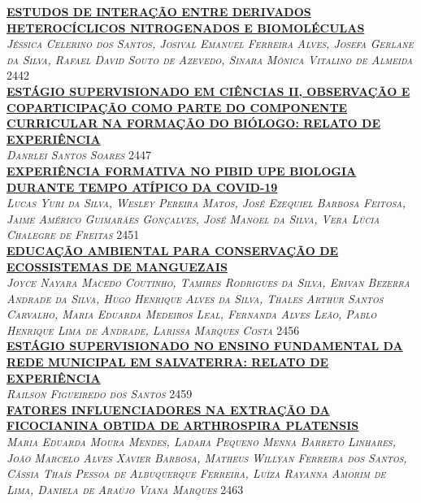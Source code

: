 \noindent \textsc{\hyperlink{trabalhos/248574.pdf.1}{\textbf{ESTUDOS DE INTERAÇÃO ENTRE DERIVADOS HETEROCÍCLICOS NITROGENADOS E BIOMOLÉCULAS}}}\\ 
\noindent \textsc{\textit{Jéssica Celerino dos Santos, Josival Emanuel Ferreira Alves, Josefa Gerlane da Silva, Rafael David Souto de Azevedo, Sinara Mônica Vitalino de Almeida}} \hfill 2442\\ 

\noindent \textsc{\hyperlink{trabalhos/250179.pdf.1}{\textbf{ESTÁGIO SUPERVISIONADO EM CIÊNCIAS II, OBSERVAÇÃO E COPARTICIPAÇÃO COMO PARTE DO COMPONENTE CURRICULAR NA FORMAÇÃO DO BIÓLOGO: RELATO DE EXPERIÊNCIA}}}\\ 
\noindent \textsc{\textit{Danrlei Santos Soares}} \hfill 2447\\ 

\noindent \textsc{\hyperlink{trabalhos/251037.pdf.1}{\textbf{EXPERIÊNCIA FORMATIVA NO PIBID UPE BIOLOGIA DURANTE TEMPO ATÍPICO DA COVID-19}}}\\ 
\noindent \textsc{\textit{Lucas Yuri da Silva, Wesley Pereira Matos, José Ezequiel Barbosa Feitosa, Jaime Américo Guimarães Gonçalves, José Manoel da Silva, Vera Lúcia Chalegre de Freitas}} \hfill 2451\\ 

\noindent \textsc{\hyperlink{trabalhos/250306.pdf.1}{\textbf{EDUCAÇÃO AMBIENTAL PARA CONSERVAÇÃO DE ECOSSISTEMAS DE MANGUEZAIS}}}\\ 
\noindent \textsc{\textit{Joyce Nayara Macedo Coutinho, Tamires Rodrigues da Silva, Erivan Bezerra Andrade da Silva, Hugo Henrique Alves da Silva, Thales Arthur Santos Carvalho, Maria Eduarda Medeiros Leal, Fernanda Alves Leão, Pablo Henrique Lima de Andrade, Larissa Marques Costa}} \hfill 2456\\ 

\noindent \textsc{\hyperlink{trabalhos/247742.pdf.1}{\textbf{ESTÁGIO SUPERVISIONADO NO ENSINO FUNDAMENTAL DA REDE MUNICIPAL EM SALVATERRA: RELATO DE EXPERIÊNCIA }}}\\ 
\noindent \textsc{\textit{Railson Figueiredo dos Santos}} \hfill 2459\\ 

\noindent \textsc{\hyperlink{trabalhos/250086.pdf.1}{\textbf{FATORES INFLUENCIADORES NA EXTRAÇÃO DA FICOCIANINA OBTIDA DE ARTHROSPIRA PLATENSIS}}}\\ 
\noindent \textsc{\textit{Maria Eduarda Moura Mendes, Ladaha Pequeno Menna Barreto Linhares, João Marcelo Alves Xavier Barbosa, Matheus Willyan Ferreira dos Santos, Cássia Thaís Pessoa de Albuquerque Ferreira, Luíza Rayanna Amorim de Lima, Daniela de Araújo Viana Marques}} \hfill 2463\\ 

